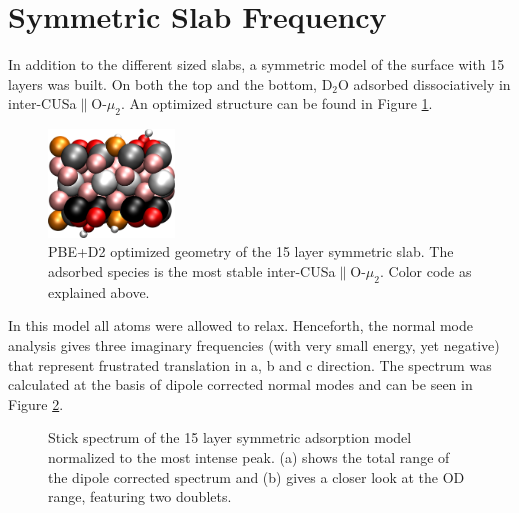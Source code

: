 \documentclass[11pt,DIV=13,BCOR=5mm,a4paper,headinclude]{scrbook}
\begin{document}
\section{Symmetric Slab Frequency}\label{symmetric_slab}
In addition to the different sized slabs, a symmetric model of the surface with 15 layers was built.
On both the top and the bottom, D$_2$O adsorbed dissociatively in inter-CUSa$\parallel$O-$\mu_2$.
An optimized structure can be found in Figure \ref{abb:symm-slab}.
 \begin{figure} [!h]
 \centering
 \includegraphics[width=0.3\textwidth]{figures/11-20/side_symmcell_iCa2.png}
  \caption{PBE+D2 optimized geometry of the 15 layer symmetric slab.
The adsorbed species is the most stable inter-CUSa$\parallel$O-$\mu_2$.
Color code as explained above.} 
        \label{abb:symm-slab}
 \end{figure}
In this model all atoms were allowed to relax.
Henceforth, the normal mode analysis gives three imaginary frequencies (with very small energy, yet negative) that represent frustrated translation in a, b and c direction.
The spectrum was calculated at the basis of dipole corrected normal modes and can be seen in Figure \ref{abb:symm-iCa2_spec}.
 \begin{figure}[!h]
    \centering
             \quad
             \caption{Stick spectrum of the 15 layer symmetric adsorption model normalized to the most intense peak.
(a) shows the total range of the dipole corrected spectrum and (b) gives a closer look at the OD range, featuring two doublets.}
            \label{abb:symm-iCa2_spec}
     \end{figure}
\end{document}
